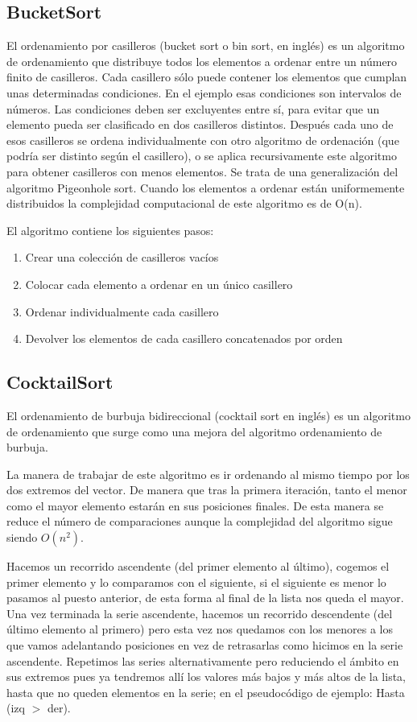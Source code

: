 \documentclass[12pt,twoside]{article}
\begin{document}
\subsection{\textbf{BucketSort}}
\setlength{\parindent}{1.5em}El ordenamiento por casilleros (bucket sort o bin sort, en inglés) es un algoritmo de ordenamiento que distribuye todos los elementos a ordenar entre un número finito de casilleros. Cada casillero sólo puede contener 
los elementos que cumplan unas determinadas condiciones. En el ejemplo esas condiciones son intervalos de números. Las condiciones deben ser excluyentes entre sí, para evitar que un elemento pueda ser clasificado en dos casilleros distintos. 
Después cada uno de esos casilleros se ordena individualmente con otro algoritmo de ordenación (que podría ser distinto según el casillero), o se aplica recursivamente este algoritmo para obtener casilleros con menos elementos. Se trata de 
una generalización del algoritmo Pigeonhole sort. Cuando los elementos a ordenar están uniformemente distribuidos la complejidad computacional de este algoritmo es de O(n).

El algoritmo contiene los siguientes pasos:
\begin{enumerate}
  \item Crear una colección de casilleros vacíos
  \item Colocar cada elemento a ordenar en un único casillero 
  \item Ordenar individualmente cada casillero
  \item Devolver los elementos de cada casillero concatenados por orden
\end{enumerate}

\subsection{\textbf{CocktailSort}}
\setlength{\parindent}{1.5em}
El ordenamiento de burbuja bidireccional (cocktail sort en inglés) es un algoritmo de ordenamiento que surge como una mejora del algoritmo ordenamiento de burbuja.

La manera de trabajar de este algoritmo es ir ordenando al mismo tiempo por los dos extremos del vector. De manera que tras la primera iteración, tanto el menor como el mayor elemento estarán en sus posiciones finales. De esta manera se reduce 
el número de comparaciones aunque la complejidad del algoritmo sigue siendo $O(n^2)$.

Hacemos un recorrido ascendente (del primer elemento al último), cogemos el primer elemento y lo comparamos con el siguiente, si el siguiente es menor lo pasamos al puesto anterior, de esta forma al final de la lista nos queda el mayor. 
Una vez terminada la serie ascendente, hacemos un recorrido descendente (del último elemento al primero) pero esta vez nos quedamos con los menores a los que vamos adelantando posiciones en vez de retrasarlas como hicimos en la serie ascendente. 
Repetimos las series alternativamente pero reduciendo el ámbito en sus extremos pues ya tendremos allí los valores más bajos y más altos de la lista, hasta que no queden elementos en la serie; en el pseudocódigo de ejemplo: Hasta (izq $>$ der).
\end{document}
